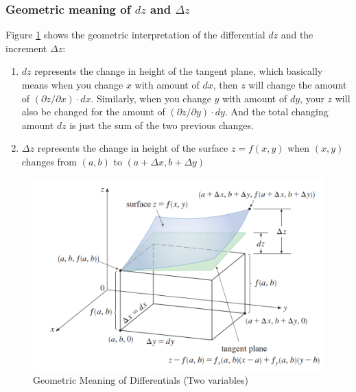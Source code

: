 \documentclass[math,code]{amznotes}
\theoremstyle{remark}
\begin{document}
\subsubsection{Geometric meaning of $dz$ and $\Delta z$}
Figure \ref{fig:geomertic-meaning-of-differential-two-variables} shows the geometric interpretation of the differential $dz$ and the increment $\Delta z$:
\begin{enumerate}
    \item $dz$  represents the change in height of the tangent plane, which basically means when you change $x$ with amount of $dx$, then $z$ will change the amount of $(\partial z / \partial x) \cdot dx$. Similarly, when you change $y$ with amount of $dy$, your $z$ will also be changed for the amount of $(\partial z / \partial y) \cdot dy$. And the total changing amount $dz$ is just the sum of the two previous changes.
    \item $\Delta z$ represents the change in height of the surface $z=f(x,y)$ when $(x,y)$ changes from $(a,b)$ to $(a+\Delta x, b+\Delta y)$
\end{enumerate}
\begin{figure}[H]
    \centering
    \includegraphics[width=0.5\linewidth]{images/geomertic-meaning-of-differential-two-variables.png}
    \caption{Geometric Meaning of Differentials (Two variables)}
    \label{fig:geomertic-meaning-of-differential-two-variables}
\end{figure}
\end{document}

